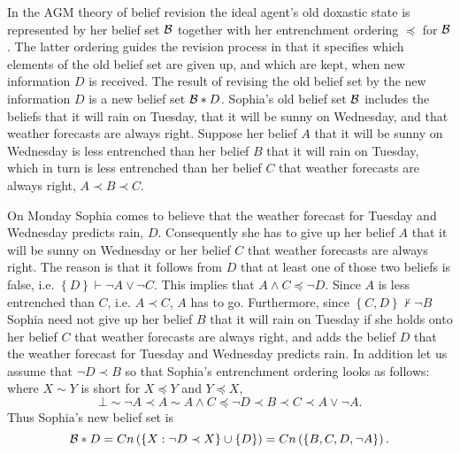 In the AGM theory of belief revision the ideal agent's old doxastic state is represented by her belief set $\cal B$ together with her entrenchment ordering $\preceq$ for $\cal B$. The latter ordering guides the revision process in that it specifies which elements of the old belief set are given up, and which are kept, when new information $D$ is received. The result of revising the old belief set by the new information $D$ is a new belief set $\begin{cal}B\end{cal}*D$. Sophia's old belief set $\cal B$ includes the beliefs that it will rain on Tuesday, that it will be sunny on Wednesday, and that weather forecasts are always right. Suppose her belief $A$ that it will be sunny on Wednesday is less entrenched than her belief $B$ that it will rain on Tuesday, which in turn is less entrenched than her belief $C$ that weather forecasts are always right, %
$A\prec B\prec C$.

On Monday Sophia comes to believe that the weather forecast for Tuesday and Wednesday predicts rain, $D$. Consequently she has to give up her belief $A$ that it will be sunny on Wednesday or her belief $C$ that weather forecasts are always right. The reason is that it follows from $D$ that at least one of those two beliefs is false, i.e. $\left\{D\right\}\vdash\neg A\vee\neg C$. This implies that $A\wedge C\preceq\neg D$.
Since $A$ is less entrenched than $C$, i.e. $A\prec C$, $A$ has to go. Furthermore, since $\left\{C,D\right\}\not\vdash\neg B$ Sophia need not give up her belief $B$ that it will rain on Tuesday if she holds onto her belief $C$ that weather forecasts are always right, and adds the belief $D$ that the weather forecast for Tuesday and Wednesday predicts rain. In addition let us assume that $\neg D\prec B$ so that Sophia's entrenchment ordering looks as follows: where $X\sim Y$ is short for $X\preceq Y$ and $Y\preceq X$,
$$\bot\sim\neg A\prec A\sim A\wedge C\preceq\neg D\prec B\prec C\prec A\vee\neg A.$$
Thus Sophia's new belief set is
$$\begin{cal}B\end{cal}*D=Cn\left(\left\{X:\neg D\prec X\right\}\cup\left\{D\right\}\right)=Cn\left(\left\{B,C,D,\neg A\right\}\right).$$

